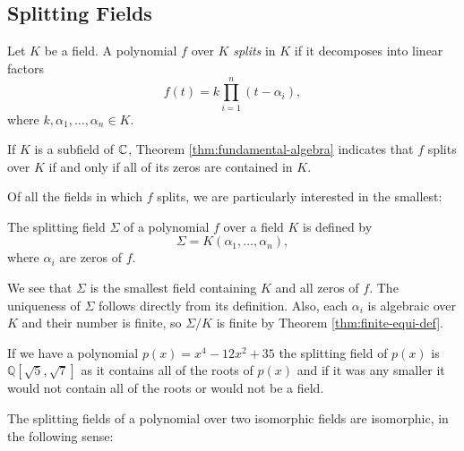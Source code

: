 \subsection{Splitting Fields}
\begin{definition}
    Let $K$ be a field. A polynomial $f$ over $K$ \textit{splits} in $K$ if it decomposes into linear factors $$
    f(t) = k \prod _{i=1} ^n (t - \alpha_i),
    $$
    where $k, \alpha_1, \ldots, \alpha_n \in K$. 
\end{definition}
If $K$ is a subfield of $\mathbb C$, Theorem \ref{thm:fundamental-algebra} indicates that $f$ splits over $K$ if and only if all of its zeros are contained in $K$. 

Of all the fields in which $f$ splits, we are particularly interested in the smallest:

\begin{definition}
    The splitting field $\Sigma$ of a polynomial $f$ over a field $K$ is defined by $$\Sigma = K(\alpha_1, \ldots, \alpha_n), $$ where $\alpha_i$ are zeros of $f$. 
\end{definition}

We see that $\Sigma$ is the smallest field containing $K$ and all zeros of $f$. The uniqueness of $\Sigma$ follows directly from its definition. Also, each $\alpha_i$ is algebraic over $K$ and their number is finite, so $\Sigma / K$ is finite by Theorem \ref{thm:finite-equi-def}. 

\begin{example}
If we have a polynomial \(p(x) = x^4 - 12x^2 + 35\) the splitting field of \(p(x)\) is \(\mathbb{Q}[\sqrt{5},\sqrt{7}]\) as it contains all of the roots of \(p(x)\) and if it was any smaller it would not contain all of the roots or would not be a field.
\end{example}

The splitting fields of a polynomial over two isomorphic fields are isomorphic, in the following sense:

